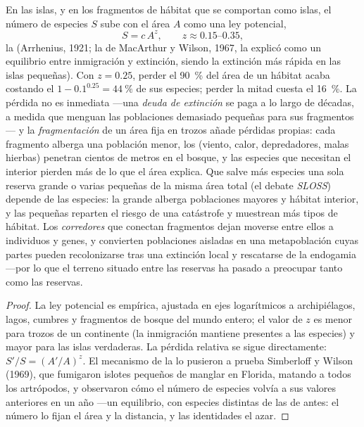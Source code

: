 \begin{proposition}\label{prop:b3:conservation-biology:area}
En las islas, y en los fragmentos de hábitat que se comportan como
islas, el número de especies $S$ sube con el área $A$ como una ley
potencial,
\[
S = c\,A^{z}, \qquad z \approx 0.15\text{--}0.35,
\]
la \emph{} (Arrhenius, 1921; la  de MacArthur y Wilson, 1967, la explicó como un equilibrio
entre inmigración y extinción, siendo la extinción más rápida en las
islas pequeñas). Con $z = 0.25$, perder el \qty{90}{\%} del área de un
hábitat acaba costando el $1 - 0.1^{0.25} = \qty{44}{\%}$ de sus
especies; perder la mitad cuesta el \qty{16}{\%}. La pérdida no es
inmediata ---una \emph{deuda de extinción} se paga a lo largo de
décadas, a medida que menguan las poblaciones demasiado pequeñas para
sus fragmentos--- y la \emph{fragmentación} de un área fija en trozos
añade pérdidas propias: cada fragmento alberga una población menor, los
\emph{} (viento, calor, depredadores, malas hierbas)
penetran cientos de metros en el bosque, y las especies que necesitan el
interior pierden más de lo que el área explica. Que salve más especies
una sola reserva grande o varias pequeñas de la misma área total (el
debate \emph{SLOSS}) depende de las especies: la grande alberga
poblaciones mayores y hábitat interior, y las pequeñas reparten el
riesgo de una catástrofe y muestrean más tipos de hábitat. Los
\emph{corredores} que conectan fragmentos dejan moverse entre ellos a
individuos y genes, y convierten poblaciones aisladas en una
metapoblación cuyas partes pueden recolonizarse tras una extinción
local y rescatarse de la endogamia ---por lo que el terreno situado
entre las reservas ha pasado a preocupar tanto como las reservas.
\end{proposition}
\begin{proof}
La ley potencial es empírica, ajustada en ejes logarítmicos a
archipiélagos, lagos, cumbres y fragmentos de bosque del mundo entero;
el valor de $z$ es menor para trozos de un continente (la inmigración
mantiene presentes a las especies) y mayor para las islas verdaderas.
La pérdida relativa se sigue directamente: $S'/S = (A'/A)^{z}$. El
mecanismo de la  lo pusieron a prueba Simberloff y
Wilson (1969), que fumigaron islotes pequeños de manglar en Florida,
matando a todos los artrópodos, y observaron cómo el número de especies
volvía a sus valores anteriores en un año ---un equilibrio, con
especies distintas de las de antes: el número lo fijan el área y la
distancia, y las identidades el azar.
\end{proof}

